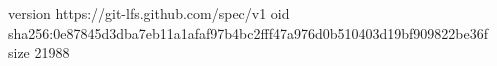 version https://git-lfs.github.com/spec/v1
oid sha256:0e87845d3dba7eb11a1afaf97b4bc2fff47a976d0b510403d19bf909822be36f
size 21988
